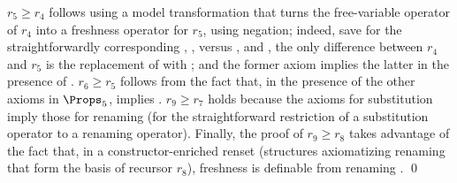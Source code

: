 %
\textit{%
	$r_5 \geq r_4$} %
follows using a model transformation that 
turns the free-variable operator of $r_4$ into a freshness operator for $r_5$, using negation; indeed, save for the straightforwardly corresponding \FvVr{}, \FvAp{}, \FvLm{} versus \FrVr{}, \FrAp{} and \FrLm{},  
the only difference between $r_4$ and $r_5$ is the replacement of 
\SwFv{} 
with 
\SwBvr{}; 
%
and the former axiom implies the latter in the presence of \FvLm{}. %
%
%
\textit{%
	$r_6 \geq r_5$} %
follows from the fact that, in the presence of the other axioms in $\Props_5$, 
\SwBvr{} implies %
\SwCg{}. %
%
\textit{%
	$r_9 \geq r_7$} %
holds because the axioms for substitution imply those for renaming (for 
the straightforward restriction of a substitution operator to a renaming operator). %
%
Finally, the proof of 
\textit{%
	$r_9 \geq r_8$} %
takes advantage of the fact that, in a constructor-enriched renset (structures axiomatizing renaming that form the basis of recursor $r_8$), freshness is definable from renaming \cite{DBLP:conf/cade/Popescu22}.  
\qed
\medskip

